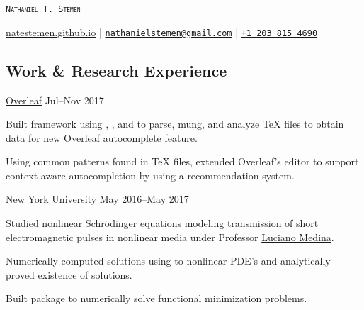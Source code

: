 \documentclass{cultvoucher}
\begin{document}
\begin{flushleft}
    {\Huge{\textsc{\texttt{Nathaniel T. Stemen}}}}
    
    {\url{natestemen.github.io} |
    \href{mailto:nathanielstemen@gmail.com}{\nolinkurl{nathanielstemen@gmail.com}}} |
    \href{tel:12038154690}{\texttt{+1\,203\,815\,4690}}
\end{flushleft}

\vspace{-10pt}

\begin{paracol}{2}

\section{Work \& Research Experience}

         {\href{https://www.overleaf.com/}{Overleaf}}
         {Jul--Nov 2017}
\begin{tightitemize}
    \item Built framework using , , and
           to parse, mung, and analyze \TeX{} files to obtain
          data for new Overleaf autocomplete feature.
    \item Using common patterns found in \TeX{} files, extended Overleaf's
          editor to support context-aware autocompletion by using a
          recommendation system.
\end{tightitemize}

         {New York University}
         {May 2016--May 2017}
\begin{tightitemize}
	\item Studied nonlinear Schr\"{o}dinger equations modeling transmission of
          short electromagnetic pulses in nonlinear media under Professor
          \href{https://www.sites.google.com/a/nyu.edu/luciano-medina/}{Luciano Medina}.
	\item Numerically computed solutions using  to nonlinear
          PDE's and analytically proved existence of solutions.
	\item Built package to numerically solve functional minimization problems.
\end{tightitemize}


\end{paracol}
\end{document}
